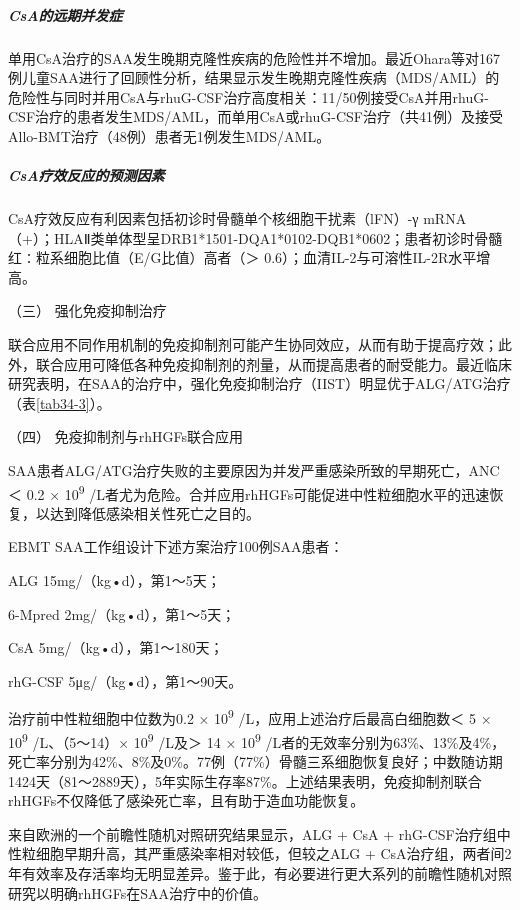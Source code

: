 \subparagraph{CsA的远期并发症}

单用CsA治疗的SAA发生晚期克隆性疾病的危险性并不增加。最近Ohara等对167例儿童SAA进行了回顾性分析，结果显示发生晚期克隆性疾病（MDS/AML）的危险性与同时并用CsA与rhuG-CSF治疗高度相关：11/50例接受CsA并用rhuG-CSF治疗的患者发生MDS/AML，而单用CsA或rhuG-CSF治疗（共41例）及接受Allo-BMT治疗（48例）患者无1例发生MDS/AML。

\subparagraph{CsA疗效反应的预测因素}

CsA疗效反应有利因素包括初诊时骨髓单个核细胞干扰素（lFN）-γ
mRNA（+）；HLAⅡ类单体型呈DRB1*1501-DQA1*0102-DQB1*0602；患者初诊时骨髓红∶粒系细胞比值（E/G比值）高者（＞
0.6）；血清IL-2与可溶性IL-2R水平增高。

\hypertarget{text00089.htmlux5cux23CHP3-10-1-3-3-3}{}
（三） 强化免疫抑制治疗

联合应用不同作用机制的免疫抑制剂可能产生协同效应，从而有助于提高疗效；此外，联合应用可降低各种免疫抑制剂的剂量，从而提高患者的耐受能力。最近临床研究表明，在SAA的治疗中，强化免疫抑制治疗（IIST）明显优于ALG/ATG治疗（表\ref{tab34-3}）。

\hypertarget{text00089.htmlux5cux23CHP3-10-1-3-3-4}{}
（四） 免疫抑制剂与rhHGFs联合应用

SAA患者ALG/ATG治疗失败的主要原因为并发严重感染所致的早期死亡，ANC ＜ 0.2
× 10\textsuperscript{9}
/L者尤为危险。合并应用rhHGFs可能促进中性粒细胞水平的迅速恢复，以达到降低感染相关性死亡之目的。

EBMT SAA工作组设计下述方案治疗100例SAA患者：

ALG 15mg/（kg•d），第1～5天；

6-Mpred 2mg/（kg•d），第1～5天；

CsA 5mg/（kg•d），第1～180天；

rhG-CSF 5μg/（kg•d），第1～90天。

治疗前中性粒细胞中位数为0.2 × 10\textsuperscript{9}
/L，应用上述治疗后最高白细胞数＜ 5 × 10\textsuperscript{9}
/L、（5～14）× 10\textsuperscript{9} /L及＞ 14 × 10\textsuperscript{9}
/L者的无效率分别为63\%、13\%及4\%，死亡率分别为42\%、8\%及0\%。77例（77\%）骨髓三系细胞恢复良好；中数随访期1424天（81～2889天），5年实际生存率87\%。上述结果表明，免疫抑制剂联合rhHGFs不仅降低了感染死亡率，且有助于造血功能恢复。

来自欧洲的一个前瞻性随机对照研究结果显示，ALG + CsA +
rhG-CSF治疗组中性粒细胞早期升高，其严重感染率相对较低，但较之ALG +
CsA治疗组，两者间2年有效率及存活率均无明显差异。鉴于此，有必要进行更大系列的前瞻性随机对照研究以明确rhHGFs在SAA治疗中的价值。

